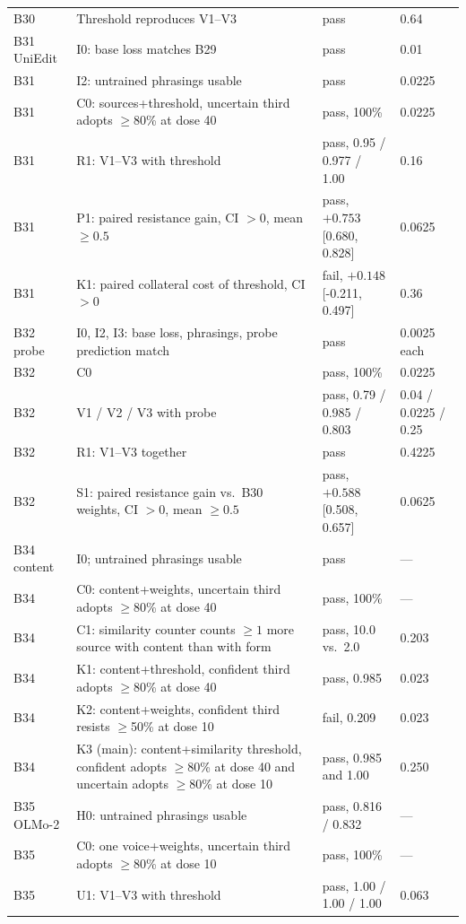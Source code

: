 \documentclass[11pt]{article}
\newcommand{\ci}[2]{\,[#1,\,#2]}
\begin{document}
\begin{longtable}{p{2.1cm}p{6.6cm}p{4.6cm}p{1.1cm}}
B30 & Threshold reproduces V1--V3 & pass & 0.64 \\
B31 UniEdit & I0: base loss matches B29 & pass & 0.01 \\
B31 & I2: untrained phrasings usable & pass & 0.0225 \\
B31 & C0: sources+threshold, uncertain third adopts $\ge$80\% at dose 40 & pass, 100\% & 0.0225 \\
B31 & R1: V1--V3 with threshold & pass, 0.95 / 0.977 / 1.00 & 0.16 \\
B31 & P1: paired resistance gain, CI $>0$, mean $\ge0.5$ & pass, $+0.753$\ci{0.680}{0.828} & 0.0625 \\
B31 & K1: paired collateral cost of threshold, CI $>0$ & fail, $+0.148$\ci{-0.211}{0.497} & 0.36 \\
B32 probe & I0, I2, I3: base loss, phrasings, probe prediction match & pass & 0.0025 each \\
B32 & C0 & pass, 100\% & 0.0225 \\
B32 & V1 / V2 / V3 with probe & pass, 0.79 / 0.985 / 0.803 & 0.04 / 0.0225 / 0.25 \\
B32 & R1: V1--V3 together & pass & 0.4225 \\
B32 & S1: paired resistance gain vs.\ B30 weights, CI $>0$, mean $\ge0.5$ & pass, $+0.588$\ci{0.508}{0.657} & 0.0625 \\
B34 content & I0; untrained phrasings usable & pass & --- \\
B34 & C0: content+weights, uncertain third adopts $\ge$80\% at dose 40 & pass, 100\% & --- \\
B34 & C1: similarity counter counts $\ge1$ more source with content than with form & pass, 10.0 vs.\ 2.0 & 0.203 \\
B34 & K1: content+threshold, confident third adopts $\ge$80\% at dose 40 & pass, 0.985 & 0.023 \\
B34 & K2: content+weights, confident third resists $\ge$50\% at dose 10 & fail, 0.209 & 0.023 \\
B34 & K3 (main): content+similarity threshold, confident adopts $\ge$80\% at dose 40 and uncertain adopts $\ge$80\% at dose 10 & pass, 0.985 and 1.00 & 0.250 \\
B35 OLMo-2 & H0: untrained phrasings usable & pass, 0.816 / 0.832 & --- \\
B35 & C0: one voice+weights, uncertain third adopts $\ge$80\% at dose 10 & pass, 100\% & --- \\
B35 & U1: V1--V3 with threshold & pass, 1.00 / 1.00 / 1.00 & 0.063 \\

\end{longtable}
\end{document}

